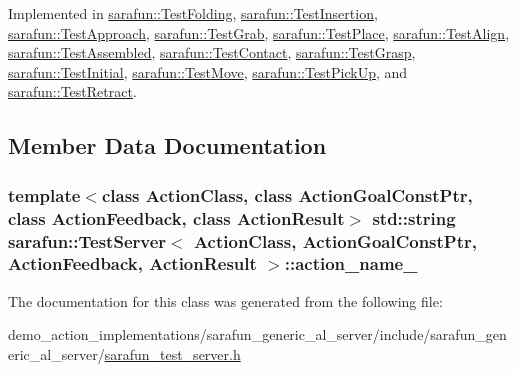 Implemented in \hyperlink{classsarafun_1_1TestFolding_a5b02e0313f9561d2ae5d21ad8ddb1c03}{sarafun\-::\-Test\-Folding}, \hyperlink{classsarafun_1_1TestInsertion_a979898f82432a7b17ee4c4e75b5b4a17}{sarafun\-::\-Test\-Insertion}, \hyperlink{classsarafun_1_1TestApproach_a28514fa2ab41956d1cd6622ffecdbd56}{sarafun\-::\-Test\-Approach}, \hyperlink{classsarafun_1_1TestGrab_a3a7022f2d95efa833b72f745bca91a04}{sarafun\-::\-Test\-Grab}, \hyperlink{classsarafun_1_1TestPlace_ac13e3b55f73d43dced8f74564b028e33}{sarafun\-::\-Test\-Place}, \hyperlink{classsarafun_1_1TestAlign_ac9c8c7df9316690c7f1daf95f9ef7e04}{sarafun\-::\-Test\-Align}, \hyperlink{classsarafun_1_1TestAssembled_a789f7d148a50abb23c9a4c0b5aeabdff}{sarafun\-::\-Test\-Assembled}, \hyperlink{classsarafun_1_1TestContact_aa20264e537658c9eb9aad4a56d7d1d07}{sarafun\-::\-Test\-Contact}, \hyperlink{classsarafun_1_1TestGrasp_a2fe802b91970efe925cf6dc620bf7378}{sarafun\-::\-Test\-Grasp}, \hyperlink{classsarafun_1_1TestInitial_a8f5793099cb6078feadada77538d515b}{sarafun\-::\-Test\-Initial}, \hyperlink{classsarafun_1_1TestMove_aa5af16aa1c4d8e9347dddf8b15106aa1}{sarafun\-::\-Test\-Move}, \hyperlink{classsarafun_1_1TestPickUp_a93fab913243b9446cdcfc8042c9a696b}{sarafun\-::\-Test\-Pick\-Up}, and \hyperlink{classsarafun_1_1TestRetract_a16161cb5e33ce3f5bc000cef4a32f23b}{sarafun\-::\-Test\-Retract}.



\subsection{Member Data Documentation}
\hypertarget{classsarafun_1_1TestServer_abe393cc25c73386e7d6783127adf98d9}{
\subsubsection[{action\-\_\-name\-\_\-}]{\setlength{\rightskip}{0pt plus 5cm}template$<$class Action\-Class, class Action\-Goal\-Const\-Ptr, class Action\-Feedback, class Action\-Result$>$ std\-::string {\bf sarafun\-::\-Test\-Server}$<$ Action\-Class, Action\-Goal\-Const\-Ptr, Action\-Feedback, Action\-Result $>$\-::action\-\_\-name\-\_\-\hspace{0.3cm}{\ttfamily [protected]}}}\label{classsarafun_1_1TestServer_abe393cc25c73386e7d6783127adf98d9}


The documentation for this class was generated from the following file\-:\begin{DoxyCompactItemize}
\item 
demo\-\_\-action\-\_\-implementations/sarafun\-\_\-generic\-\_\-al\-\_\-server/include/sarafun\-\_\-generic\-\_\-al\-\_\-server/\hyperlink{sarafun__test__server_8h}{sarafun\-\_\-test\-\_\-server.\-h}\end{DoxyCompactItemize}
